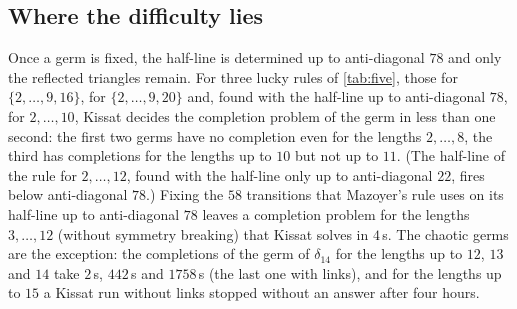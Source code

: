 \subsection{Where the difficulty lies}\label{sec:difficulty}

Once a germ is fixed, the half-line is determined up to anti-diagonal $78$
and only the reflected triangles remain. For three lucky rules of
\cref{tab:five}, those for $\{2,\dots,9,16\}$, for $\{2,\dots,9,20\}$ and,
found with the half-line up to anti-diagonal $78$, for $2,\dots,10$, Kissat
decides the completion problem of the germ in less than one second: the
first two germs have no completion even for the lengths $2,\dots,8$, the
third has completions for the lengths up to $10$ but not up to $11$. (The
half-line of the rule for $2,\dots,12$, found with the half-line only up to
anti-diagonal $22$, fires below anti-diagonal $78$.) Fixing the $58$ transitions that
Mazoyer's rule uses on its half-line up to anti-diagonal $78$ leaves a
completion problem for the lengths $3,\dots,12$ (without symmetry breaking)
that Kissat solves in $4$\,s. The chaotic germs are the exception: the
completions of the germ of $\delta_{14}$ for the lengths up to $12$, $13$
and $14$ take $2$\,s, $442$\,s and $1758$\,s (the last one with links), and
for the lengths up to $15$ a Kissat run without links stopped without an
answer after four hours.

